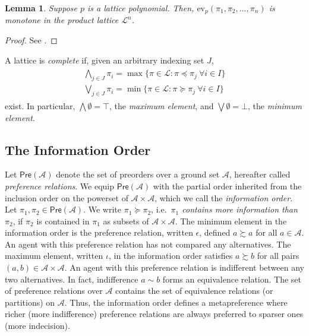 \documentclass[conference]{ieeeconf}
\newcommand{\A}{\mathcal{A}}
\newcommand{\Pref}{\mathsf{Pre}}
\renewcommand{\L}{\mathcal{L}}
\newcommand{\prefers}{\succsim}
\newcommand{\bigjoin}{\bigvee}
\newcommand{\bigmeet}{\bigwedge}
\newtheorem{lemma}{Lemma}
\begin{document}
\begin{lemma} \label{lem:lattice-polynomial}
    Suppose $p$ is a lattice polynomial. Then, $\mathrm{ev}_p(\pi_1,\pi_2,\dots,\pi_n)$ is monotone in the product lattice $\L^n$.
\end{lemma}
\begin{proof}
    See \cite[\S I.5 Lemma 4]{birkhoff1940}.
\end{proof}

A lattice is \emph{complete} if, given an arbitrary indexing set $J$,
\begin{align}
    \begin{aligned}
        \bigmeet_{j \in J} \pi_i = \max\{\pi \in \L : \pi \preceq \pi_j~\forall i \in I\} \\
        \bigjoin_{j \in J} \pi_i = \min\{\pi \in \L : \pi \succeq \pi_j~\forall i \in I\}
    \end{aligned} \label{eq:complete lattice}
\end{align}
exist. In particular, $\bigmeet \emptyset = \top$, the \emph{maximum element}, and $\bigjoin \emptyset = \bot$, the \emph{minimum element}.



\subsection{The Information Order}

Let $\Pref(\A)$ denote the set of preorders over a ground set $\A$, hereafter called \emph{preference relations}. We equip $\Pref(\A)$ with the partial order inherited from the inclusion order on the powerset of $\A \times \A$, which we call the \emph{information order}. Let $\pi_1, \pi_2 \in \Pref(\A)$. We write $\pi_1 \succeq \pi_2$, i.e.~{\it $\pi_1$ contains more information than $\pi_2$}, if $\pi_2$ is contained in $\pi_1$ as subsets of $\A \times \A$. The minimum element in the information order is the preference relation, written $\epsilon$, defined $a \prefers a$ for all $a \in \A$. An agent with this preference relation has not compared any alternatives. The maximum element, written $\iota$, in the information order satisfies $a \prefers b$ for all pairs $(a,b) \in \A \times \A$. An agent with this preference relation is indifferent between any two alternatives. In fact, indifference $a \sim b$ forms an equivalence relation. The set of preference relations over $\A$ contains the set of equivalence relations (or partitions) on $\A$. Thus, the information order defines a metapreference where richer (more indifference) preference relations are always preferred to sparser ones (more indecision).
\end{document}
